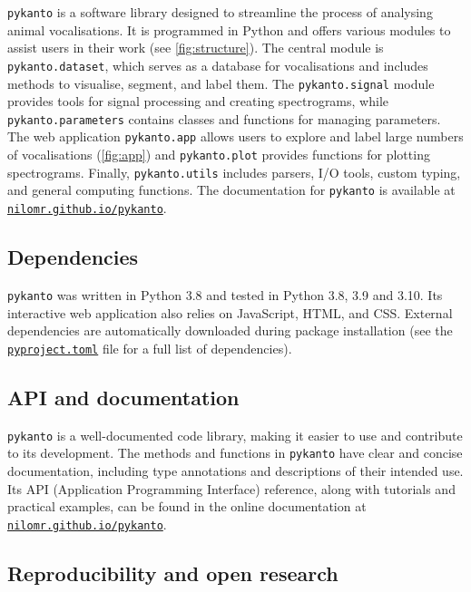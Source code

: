 \texttt{pykanto} is a software library designed to streamline the process of
analysing animal vocalisations. It is programmed in Python and offers various
modules to assist users in their work (see \autoref{fig:structure}). The central module is
\texttt{pykanto.dataset}, which serves as a database for vocalisations and
includes methods to visualise, segment, and label them. The \texttt{pykanto.signal} module provides tools for
signal processing and creating spectrograms, while \texttt{pykanto.parameters}
contains classes and functions for managing parameters. The web application
\texttt{pykanto.app} allows users to explore and label large numbers of
vocalisations (\autoref{fig:app}) and \texttt{pykanto.plot} provides functions for
plotting spectrograms. Finally, \texttt{pykanto.utils} includes parsers, I/O
tools, custom typing, and general computing functions. The documentation for
\texttt{pykanto} is available at
\href{https://nilomr.github.io/pykanto}{\nolinkurl{nilomr.github.io/pykanto}}.

\subsection{Dependencies}

\texttt{pykanto} was written in Python 3.8 and tested in Python 3.8, 3.9 and
3.10. Its interactive web application also relies on JavaScript, HTML, and CSS.
External dependencies are automatically downloaded during package installation
(see the
\href{https://github.com/nilomr/pykanto/blob/main/pyproject.toml}{\texttt{pyproject.toml}}
file for a full list of dependencies).

\subsection{API and documentation}

\texttt{pykanto} is a well-documented code library, making it easier to use and
contribute to its development. The methods and functions in \texttt{pykanto} have clear
and concise documentation, including type annotations and descriptions of their
intended use. Its API (Application Programming Interface) reference, along with
tutorials and practical examples, can be found in the online documentation
at \href{https://nilomr.github.io/pykanto}{\nolinkurl{nilomr.github.io/pykanto}}.

\subsection{Reproducibility and open research}


